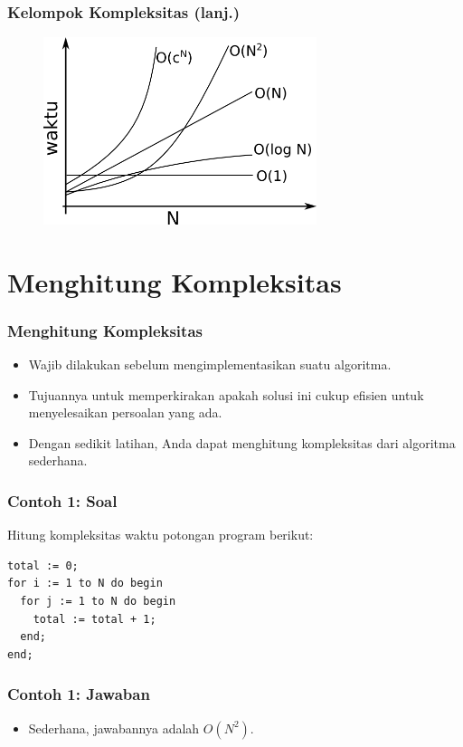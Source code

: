 \documentclass{beamer}
\begin{document}
\begin{frame}
\frametitle{Kelompok Kompleksitas (lanj.)}
\begin{figure}
    \includegraphics[width=8cm]{asset/grafik.png}
\end{figure}
\end{frame}

\section{Menghitung Kompleksitas}
\frame{\sectionpage}

\begin{frame}
\frametitle{Menghitung Kompleksitas}
\begin{itemize}
    \item Wajib dilakukan sebelum mengimplementasikan suatu algoritma.
    \item Tujuannya untuk memperkirakan apakah solusi ini cukup efisien untuk menyelesaikan persoalan yang ada.
    \item Dengan sedikit latihan, Anda dapat menghitung kompleksitas dari algoritma sederhana.
\end{itemize}
\end{frame}

\begin{frame}[fragile]
\frametitle{Contoh 1: Soal}
Hitung kompleksitas waktu potongan program berikut:

\hfill

\begin{lstlisting}
total := 0;
for i := 1 to N do begin
  for j := 1 to N do begin
    total := total + 1;
  end;
end;
\end{lstlisting}
\end{frame}

\begin{frame}
\frametitle{Contoh 1: Jawaban}
\begin{itemize}
    \item Sederhana, jawabannya adalah $O(N^2)$.
\end{itemize}
\end{frame}
\end{document}
